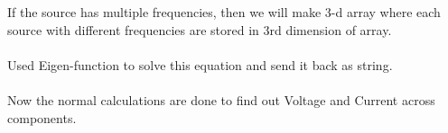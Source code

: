 \documentclass{scrreprt}
\begin{document}
If the source has multiple frequencies, then we will make 3-d array where each source with different frequencies are stored in 3rd dimension of array. 
\\
\\
Used Eigen-function to solve this equation and send it back as string.
\\
\\
Now the normal calculations are done to find out Voltage and Current across components.
$ $
\end{document}
